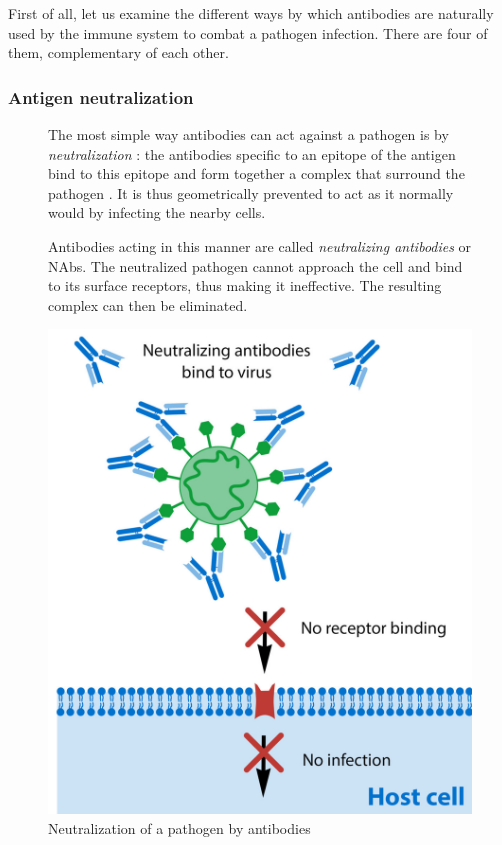First of all, let us examine the different ways by which
antibodies are naturally used by the immune system to combat
a pathogen infection. There are four of them, complementary of each other.

\subsubsection{Antigen neutralization}

\begin{figure}[H]
    \begin{minipage}{0.55\textwidth}
        The most simple way antibodies can act against a pathogen is by
        \emph{neutralization} : the antibodies specific to an epitope of the
        antigen bind to this epitope and form together a complex that surround
        the pathogen \cite{langermans_antimicrobial_1994}.
        It is thus geometrically prevented to act as it normally would 
        by infecting the nearby cells.

        Antibodies acting in this manner are called \emph{neutralizing antibodies}
        or NAbs. The neutralized pathogen cannot approach the cell and
        bind to its surface receptors, thus making it ineffective. 
        The resulting complex can then be eliminated.
    \end{minipage}\hfill
    \begin{minipage}{0.35\textwidth}
        \centering
        \includegraphics[width=\textwidth]{../Images/neutralization.png}   
        \caption{Neutralization of a pathogen by antibodies}
        \label{fig:neutralization}
    \end{minipage}
\end{figure}


